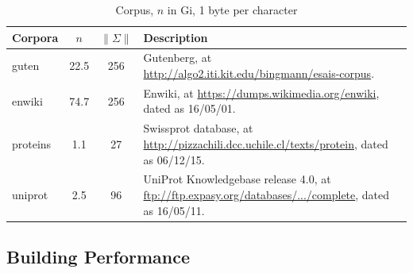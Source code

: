 \documentclass[10pt,journal,compsoc]{IEEEtran}
\begin{document}
\renewcommand\arraystretch{1.3}
\begin{table}[!h]
	\caption{Corpus, $n$ in Gi, 1 byte per character} 
	\label{tbl:corpora}
	\centering
	\begin{tabular}{|l|c|c|p{5cm}|}
		\hline
		Corpora & \multicolumn{1}{c|}{$n$} & \multicolumn{1}{c|}{$\|\Sigma\|$} & Description \\\hline
		guten & 22.5 & 256 & Gutenberg, at \url{http://algo2.iti.kit.edu/bingmann/esais-corpus}.\\\hline 				
		enwiki & 74.7 & 256 & Enwiki, at \url{https://dumps.wikimedia.org/enwiki}, dated as 16/05/01. \\\hline	
		proteins & 1.1 & 27 & Swissprot database, at \url{http://pizzachili.dcc.uchile.cl/texts/protein}, dated as 06/12/15. \\\hline
		uniprot & 2.5 & 96 & UniProt Knowledgebase release 4.0, at \url{ftp://ftp.expasy.org/databases/.../complete}, dated as 16/05/11. \\\hline
	\end{tabular}
\end{table}

\subsection{Building Performance}
\end{document}
